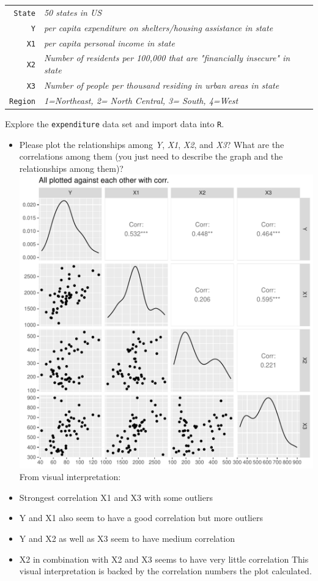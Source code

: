 \documentclass[12pt,letterpaper]{article}
\begin{document}
\begin{enumerate}
\begin{tabular}{r|l}
	\texttt{State} &\emph{50 states in US} \\
	\texttt{Y} & \emph{per capita expenditure on shelters/housing assistance in state}\\
	\texttt{X1} &\emph{per capita personal income in state} \\
	\texttt{X2} &  \emph{Number of residents per 100,000 that are "financially insecure" in state}\\
	\texttt{X3} &  \emph{Number of people per thousand residing in urban areas in state} \\
	\texttt{Region} &  \emph{1=Northeast, 2= North Central, 3= South, 4=West} \\
\end{tabular}

\vspace{.5cm}
\noindent Explore the \texttt{expenditure} data set and import data into \texttt{R}.
\vspace{.5cm}
\vspace{.5cm}
\begin{itemize}

\item
Please plot the relationships among \emph{Y}, \emph{X1}, \emph{X2}, and \emph{X3}? What are the correlations among them (you just need to describe the graph and the relationships among them)?\\

\includegraphics[width=.50\textwidth]{plot2.pdf} \\

From visual interpretation: 
\item Strongest correlation X1 and X3 with some outliers
\item Y and X1 also seem to have a good correlation but more outliers
\item Y and X2 as well as X3 seem to have medium correlation
\item X2 in combination with X2 and X3 seems to have very little correlation
This visual interpretation is backed by the correlation numbers the plot calculated. \\


\end{itemize}
\end{enumerate}
\end{document}
